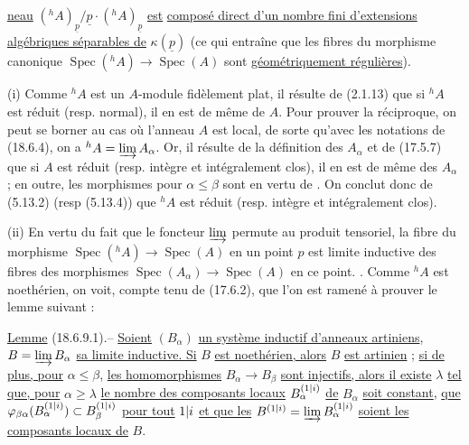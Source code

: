 \uline{neau} $({}^h A)_{\underline p}/\underline p\cdot({}^h A)_{\underline p}$ \uline{est}  \uline{composé direct d'un nombre fini d'extensions algébriques séparables de} $\kappa(\underline p)$ (ce qui entraîne que les fibres du morphisme canonique $\operatorname{Spec}({}^h A)\to\operatorname{Spec}(A)$ sont \uline{géométriquement régulières}).

(i) Comme ${}^h A$ est un $A$-module fidèlement plat, il résulte de (2.1.13) que si ${}^h A$ est  réduit (resp. normal), il en est de même de $A$. Pour prouver la réciproque, on peut se borner au cas où l'anneau $A$ est local, de sorte  qu'avec les notations de (18.6.4), on a ${}^h A=\varinjlim A_\alpha$. Or, il résulte de la définition des $A_\alpha$ et de (17.5.7) que si $A$ est réduit (resp. intègre et intégralement clos), il en est de même des $A_\alpha$ ;  en outre, les   morphismes   pour $\alpha\leq\beta$ sont   en vertu de . On conclut donc de (5.13.2) (resp (5.13.4)) que ${}^h A$ est réduit (resp. intègre et intégralement clos).

(ii)  En vertu du fait que le foncteur $\varinjlim$ permute au produit tensoriel, la fibre du morphisme $\operatorname{Spec}({}^h A)\to\operatorname{Spec}(A)$ en un point $p$ est limite inductive des fibres des morphismes $\operatorname{Spec}(A_\alpha)\to\operatorname{Spec}(A)$ en ce point. . Comme ${}^h A$ est noethérien, on voit, compte tenu de (17.6.2), que l'on est ramené à prouver le lemme suivant :

\uline{Lemme} (18.6.9.1).-- \uline{Soient}  $(B_\alpha)$ \uline{un système inductif d'anneaux artiniens}, $B=\varinjlim B_\alpha$ \uline{sa limite inductive. Si} $B$ \uline{est noethérien, alors} $B$ \uline{est artinien} ;  \uline{si de plus, pour} $\alpha\leq\beta$, \uline{les homomorphismes} \inserted{$\varphi_{\beta\alpha}:$} $B_\alpha\to B_\beta$ \uline{sont injectifs, alors il existe} $\lambda$ \uline{tel que, pour} $\alpha\geq\lambda$ \uline{le nombre des composants locaux}  $B_\alpha^{(1|i)}$ \uline{de} $B_\alpha$ \uline{soit constant},  \uline{que} $\varphi_{\beta\alpha}(B_\alpha^{(1|i)})\subset B_\beta^{(1|i)}$ \uline{pour tout} $1|i$ \uline{et que les} $B^{(1|i)}=\varinjlim B_\alpha^{(1|i)}$ \uline{soient les composants locaux de} $B$.

